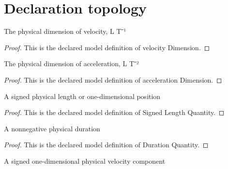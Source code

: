 \section{Declaration topology}
\begin{definition}
  \label{def:physics:phyx-mini-0749:phyxminiproblems-problemphyxmini0749-velocitydimension}
  The physical dimension of velocity, L T⁻¹
\end{definition}
\begin{proof}
  This is the declared model definition of velocity Dimension.
\end{proof}
\begin{definition}
  \label{def:physics:phyx-mini-0749:phyxminiproblems-problemphyxmini0749-accelerationdimension}
  The physical dimension of acceleration, L T⁻²
\end{definition}
\begin{proof}
  This is the declared model definition of acceleration Dimension.
\end{proof}
\begin{definition}
  \label{def:physics:phyx-mini-0749:phyxminiproblems-problemphyxmini0749-signedlengthquantity}
  A signed physical length or one-dimensional position
\end{definition}
\begin{proof}
  This is the declared model definition of Signed Length Quantity.
\end{proof}
\begin{definition}
  \label{def:physics:phyx-mini-0749:phyxminiproblems-problemphyxmini0749-durationquantity}
  A nonnegative physical duration
\end{definition}
\begin{proof}
  This is the declared model definition of Duration Quantity.
\end{proof}
\begin{definition}
  \label{def:physics:phyx-mini-0749:phyxminiproblems-problemphyxmini0749-signedvelocityquantity}
  A signed one-dimensional physical velocity component
\end{definition}
